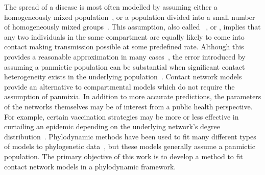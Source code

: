 
The spread of a disease is most often modelled by assuming either a
homogeneously mixed population~\autocite{hamer1906milroy,
kermack1927contribution}, or a population divided into a small number of
homogeneously mixed groups~\autocite{rushton1955deterministic}. This
assumption, also called ~\autocite{heesterbeek2000mathematical}, or , implies
that any two individuals in the same compartment are equally likely to come
into contact making transmission possible at some predefined rate. Although
this provides a reasonable approximation in many
cases~\autocite{anderson1992infectious}, the error introduced by assuming a
panmictic population can be substantial when significant contact heterogeneity
exists in the underlying
population~\autocite{bansal2007individual,barthelemy2005dynamical,keeling2005networks}.
Contact network models provide an alternative to compartmental models which do
not require the assumption of panmixia. In addition to more accurate
predictions, the parameters of the networks themselves may be of interest from
a public health perspective. For example, certain vaccination strategies may be
more or less effective in curtailing an epidemic depending on the underlying
network's degree distribution~\autocite{peng2013vaccination, ma2013importance}.
Phylodynamic methods have been used to fit many different types of models to
phylogenetic data~\autocite{pybus2009evolutionary,volz2013viral}, but these
models generally assume a panmictic population. The primary objective of this
work is to develop a method to fit contact network models in a phylodynamic
framework.

\newcommand{\G}{\mathcal{G}}
\newcommand{\Nu}{\mathcal{N}}


